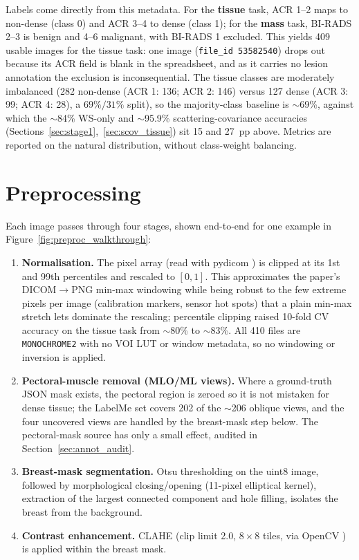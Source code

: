 Labels come directly from this metadata. For the \textbf{tissue} task, ACR 1--2 maps to non-dense (class 0) and ACR 3--4 to dense (class 1); for the \textbf{mass} task, BI-RADS 2--3 is benign and 4--6 malignant, with BI-RADS 1 excluded. This yields 409 usable images for the tissue task: one image (\texttt{file\_id 53582540}) drops out because its ACR field is blank in the spreadsheet, and as it carries no lesion annotation the exclusion is inconsequential. The tissue classes are moderately imbalanced (282 non-dense (ACR 1: 136; ACR 2: 146) versus 127 dense (ACR 3: 99; ACR 4: 28), a $69\%/31\%$ split), so the majority-class baseline is $\sim$69\%, against which the $\sim$84\% WS-only and $\sim$95.9\% scattering-covariance accuracies (Sections~\ref{sec:stage1},~\ref{sec:scov_tissue}) sit 15 and 27~pp above. Metrics are reported on the natural distribution, without class-weight balancing.

\section{Preprocessing} \label{sec:preprocessing}

Each image passes through four stages, shown end-to-end for one example in Figure~\ref{fig:preproc_walkthrough}:
\begin{enumerate}
    \item \textbf{Normalisation.} The pixel array (read with pydicom \cite{pydicom2024}) is clipped at its 1st and 99th percentiles and rescaled to $[0,1]$. This approximates the paper's DICOM$\rightarrow$PNG min-max windowing while being robust to the few extreme pixels per image (calibration markers, sensor hot spots) that a plain min-max stretch lets dominate the rescaling; percentile clipping raised 10-fold CV accuracy on the tissue task from $\sim$80\% to $\sim$83\%. All 410 files are \texttt{MONOCHROME2} with no VOI LUT or window metadata, so no windowing or inversion is applied.
    \item \textbf{Pectoral-muscle removal (MLO/ML views).} Where a ground-truth JSON mask exists, the pectoral region is zeroed so it is not mistaken for dense tissue; the LabelMe set covers 202 of the $\sim$206 oblique views, and the four uncovered views are handled by the breast-mask step below. The pectoral-mask source has only a small effect, audited in Section~\ref{sec:annot_audit}.
    \item \textbf{Breast-mask segmentation.} Otsu thresholding \cite{otsu1979threshold} on the uint8 image, followed by morphological closing/opening (11-pixel elliptical kernel), extraction of the largest connected component and hole filling, isolates the breast from the background.
    \item \textbf{Contrast enhancement.} CLAHE \cite{pizer1987adaptive} (clip limit 2.0, $8 \times 8$ tiles, via OpenCV \cite{bradski2000opencv}) is applied within the breast mask.
\end{enumerate}

